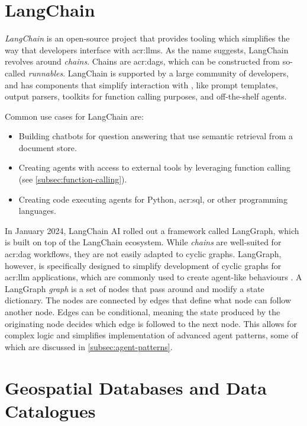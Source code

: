 \section{LangChain}
\label{sec:langchain}

\textit{LangChain} \citep{langchainaiLangchainaiLangchain2022} is an open-source project that provides tooling which simplifies the way that developers interface with \glspl{acr:llm}. As the name suggests, LangChain revolves around \textit{chains}. Chains are \glspl{acr:dag}, which can be constructed from so-called \textit{runnables}. LangChain is supported by a large community of developers, and has components that simplify interaction with , like prompt templates, output parsers, toolkits for function calling purposes, and off-the-shelf agents.

Common use cases for LangChain are:

\begin{itemize}
    \item Building chatbots for question answering that use semantic retrieval from a document store.
    \item Creating agents with access to external tools by leveraging function calling (see \autoref{subsec:function-calling}).
    \item Creating code executing agents for Python, \acrshort{acr:sql}, or other programming languages.
\end{itemize}

In January 2024, LangChain AI rolled out a framework called LangGraph, which is built on top of the LangChain ecosystem. While \textit{chains} are well-suited for \gls{acr:dag} workflows, they are not easily adapted to cyclic graphs. LangGraph, however, is specifically designed to simplify development of cyclic graphs for \acrshort{acr:llm} applications, which are commonly used to create agent-like behaviours \citep{langchainaiLangchainaiLanggraph2024}. A LangGraph \textit{graph} is a set of nodes that pass around and modify a state dictionary. The nodes are connected by edges that define what node can follow another node. Edges can be conditional, meaning the state produced by the originating node decides which edge is followed to the next node. This allows for complex logic and simplifies implementation of advanced agent patterns, some of which are discussed in \autoref{subsec:agent-patterns}.


\section{Geospatial Databases and Data Catalogues}
\label{sec:geo-dbs-and-data-catalogues}

